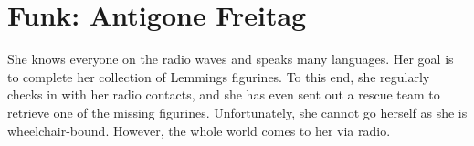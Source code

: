 \newpage

\section{Funk: Antigone Freitag}

She knows everyone on the radio waves and speaks many languages. Her goal is to complete her collection of Lemmings figurines. To this end, she regularly checks in with her radio contacts, and she has even sent out a rescue team to retrieve one of the missing figurines. Unfortunately, she cannot go herself as she is wheelchair-bound. However, the whole world comes to her via radio.

\newpage
\begin{npcBox}[title=Antigone]

    \begin{aspects}
    \item {}
    \item {}
    \item {}
    \item {}
    \end{aspects}

    \begin{skills}
    \item {}
    \item {}
    \item {}
    \item {}
    \item {}
    \item {}
    \item {}
    \item {}
    \item {}
    \item {}
    \item {}
    \item {}
    \item {}
    \item {}
    \item {}
    \item {}
    \item {}
    \item {}
    \item {}
    \end{skills}


\end{npcBox}
